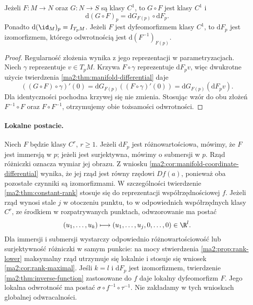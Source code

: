 \begin{stwierdzenie}
\label{ma2:prop:manifold-chain}
Jeżeli $F:M\to N$ oraz $G:N\to S$ są klasy $C^1$,
to $G\circ F$ jest klasy $C^1$ i
\[
 \mathrm d(G\circ F)_p=\mathrm dG_{F(p)}\circ\mathrm dF_p.
\]
Ponadto $\mathrm d(\id_M)_p=I_{T_pM}$. Jeżeli $F$ jest
dyfeomorfizmem klasy $C^1$, to $\mathrm dF_p$ jest
izomorfizmem, którego odwrotnością jest
$\mathrm d(F^{-1})_{F(p)}$.
\end{stwierdzenie}
\begin{proof}
Regularność złożenia wynika z jego reprezentacji w
parametryzacjach. Niech $\gamma$ reprezentuje $v\in T_pM$.
Krzywa $F\circ\gamma$ reprezentuje $\mathrm dF_p v$,
więc dwukrotne użycie twierdzenia
\ref{ma2:thm:manifold-differential} daje
\[
 ((G\circ F)\circ\gamma)'(0)
 =\mathrm dG_{F(p)}((F\circ\gamma)'(0))
 =\mathrm dG_{F(p)}(\mathrm dF_p v).
\]
Dla identyczności pochodna krzywej się nie zmienia.
Stosując wzór do obu złożeń $F^{-1}\circ F$ oraz
$F\circ F^{-1}$, otrzymujemy obie tożsamości odwrotności.
\end{proof}

\paragraph{Lokalne postacie.}
Niech $F$ będzie klasy $C^r$, $r\ge1$.
Jeżeli $\mathrm dF_p$ jest różnowartościowa, mówimy,
że $F$ jest immersją w $p$; jeżeli jest surjektywna,
mówimy o submersji w $p$. Rząd różniczki oznacza
wymiar jej obrazu. Z wniosku
\ref{ma2:cor:manifold-coordinate-differential}
wynika, że jej rząd jest równy rzędowi $Df(a)$,
ponieważ oba pozostałe czynniki są izomorfizmami.
W szczególności twierdzenie
\ref{ma2:thm:constant-rank} stosuje się do
reprezentacji współrzędnościowej $f$.
Jeżeli rząd wynosi stale $j$ w otoczeniu punktu,
to w odpowiednich współrzędnych klasy $C^r$,
ze środkiem w rozpatrywanych punktach, odwzorowanie
ma postać
\[
 (u_1,\ldots,u_k)\longmapsto
 (u_1,\ldots,u_j,0,\ldots,0)\in\R^l.
\]
Dla immersji i submersji wystarczy odpowiednio
różnowartościowość lub surjektywność różniczki
w samym punkcie: na mocy stwierdzenia
\ref{ma2:prop:rank-lower} maksymalny rząd utrzymuje
się lokalnie i stosuje się wniosek
\ref{ma2:cor:rank-maximal}.
Jeśli $k=l$ i $\mathrm dF_p$ jest izomorfizmem, twierdzenie
\ref{ma2:thm:inverse-function} zastosowane do $f$ daje
lokalny dyfeomorfizm $F$. Jego lokalna odwrotność ma
postać $\sigma\circ f^{-1}\circ\tau^{-1}$.
Nie zakładamy w tych wnioskach globalnej odwracalności.

